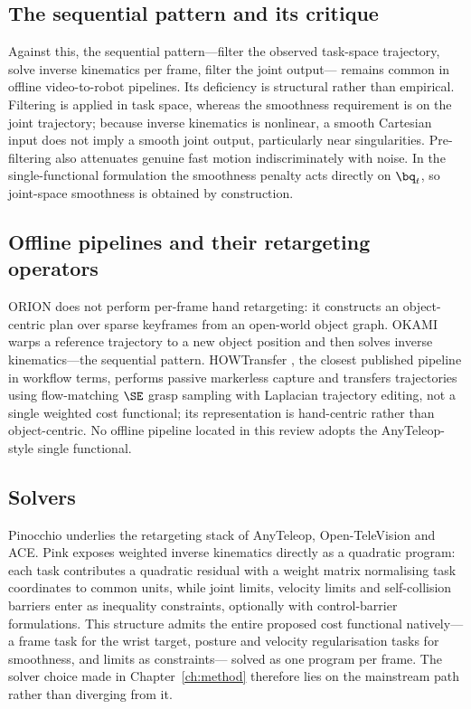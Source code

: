 \subsection{The sequential pattern and its critique}

Against this, the sequential pattern---filter the observed task-space
trajectory, solve inverse kinematics per frame, filter the joint output---
remains common in offline video-to-robot pipelines. Its deficiency is
structural rather than empirical. Filtering is applied in task space, whereas
the smoothness requirement is on the joint trajectory; because inverse
kinematics is nonlinear, a smooth Cartesian input does not imply a smooth joint
output, particularly near singularities. Pre-filtering also attenuates genuine
fast motion indiscriminately with noise. In the single-functional formulation
the smoothness penalty acts directly on $\bq_t$, so joint-space smoothness is
obtained by construction.

\subsection{Offline pipelines and their retargeting operators}

ORION \cite{orion} does not perform per-frame hand retargeting: it constructs an
object-centric plan over sparse keyframes from an open-world object graph.
OKAMI \cite{okami} warps a reference trajectory to a new object position and
then solves inverse kinematics---the sequential pattern. HOWTransfer
\cite{howtransfer}, the closest published pipeline in workflow terms, performs
passive markerless capture and transfers trajectories using flow-matching
$\SE$ grasp sampling with Laplacian trajectory editing, not a single weighted
cost functional; its representation is hand-centric rather than object-centric.
No offline pipeline located in this review adopts the AnyTeleop-style single
functional.

\subsection{Solvers}

Pinocchio underlies the retargeting stack of AnyTeleop, Open-TeleVision and
ACE. Pink \cite{pink} exposes weighted inverse kinematics directly as a
quadratic program: each task contributes a quadratic residual with a weight
matrix normalising task coordinates to common units, while joint limits,
velocity limits and self-collision barriers enter as inequality constraints,
optionally with control-barrier formulations. This structure admits the entire
proposed cost functional natively---a frame task for the wrist target, posture
and velocity regularisation tasks for smoothness, and limits as constraints---
solved as one program per frame. The solver choice made in
Chapter~\ref{ch:method} therefore lies on the mainstream path rather than
diverging from it.

